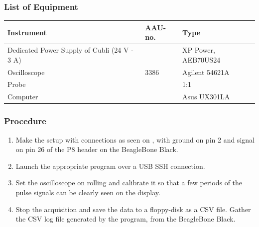 \subsubsection{List of Equipment}
\begin{table}[H]
  \begin{tabular}{|l|l|p{4.3cm}|}
    \hline%
    \textbf{Instrument}                                   &  \textbf{AAU-no.} &  \textbf{Type}            \\
    \hline%
    Dedicated Power Supply of Cubli \small{(24 V - 3 A)} &               &  XP Power, AEB70US24 \\
    \hline%
    Oscilloscope                                          &  3386             &  Agilent 54621A           \\
    \hline%
    Probe                                                 &                   &  1:1                      \\
    \hline%
      Computer                                            &                   &  Asus UX301LA  \\
    \hline%
  \end{tabular}
\end{table}

\subsubsection{Procedure}
\begin{enumerate}
  \item Make the setup with connections as seen on , with ground on pin 2 and signal on pin 26 of the P8 header on the BeagleBone Black.
  \item Launch the appropriate program over a USB SSH connection.
  \item Set the oscilloscope on rolling and calibrate it so that a few periods of the pulse signals can be clearly seen on the display.
  \item Stop the acquisition and save the data to a floppy-disk as a CSV file. Gather the CSV log file generated by the program, from the BeagleBone Black.
\end{enumerate}

